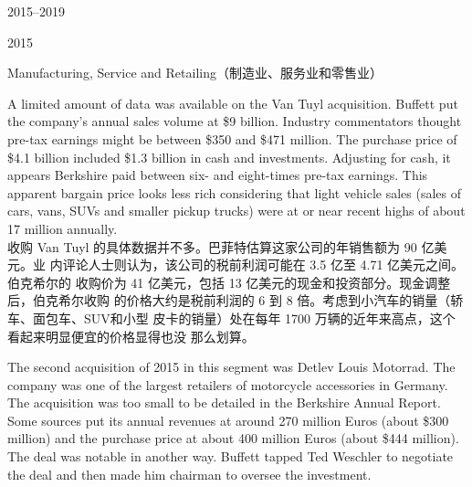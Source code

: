 \begin{chapter}{2015--2019}
\begin{section}{2015}
\begin{subsection}{Manufacturing, Service and Retailing（制造业、服务业和零售业）}
\begin{verseparallel}
  {
    A limited amount of data was available on the Van Tuyl acquisition. Buffett
    put the company's annual sales volume at \$9 billion. Industry commentators
    thought pre-tax earnings might be between \$350 and \$471 million.
     The purchase price of \$4.1 billion included \$1.3 billion in
    cash and investments. Adjusting for cash, it appears Berkshire paid between
    six- and eight-times pre-tax earnings. This apparent bargain price looks
    less rich considering that light vehicle sales (sales of cars, vans, SUVs
    and smaller pickup trucks) were at or near recent highs of about 17 million
    annually.  \\
  }
  {
    收购 Van Tuyl 的具体数据并不多。巴菲特估算这家公司的年销售额为 90 亿美元。业
    内评论人士则认为，该公司的税前利润可能在 3.5 亿至 4.71 亿美元之间。伯克希尔的
    收购价为 41 亿美元，包括 13 亿美元的现金和投资部分。现金调整后，伯克希尔收购
    的价格大约是税前利润的 6 到 8 倍。考虑到小汽车的销量（轿车、面包车、SUV和小型
    皮卡的销量）处在每年 1700 万辆的近年来高点，这个看起来明显便宜的价格显得也没
    那么划算。
  }
\end{verseparallel}

\begin{verseparallel}
  {

    The second acquisition of 2015 in this segment was Detlev Louis Motorrad.
    The company was one of the largest retailers of motorcycle accessories in
    Germany. The acquisition was too small to be detailed in the Berkshire
    Annual Report. Some sources put its annual revenues at around 270 million
    Euros (about \$300 million) and the purchase price at about 400 million
    Euros (about \$444 million).  The
    deal was notable in another way. Buffett tapped Ted Weschler to negotiate
    the deal and then made him chairman to oversee the investment. \\

}
\end{verseparallel}
\end{subsection}
\end{section}
\end{chapter}
